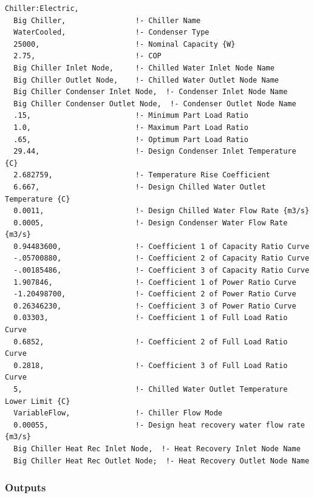 \begin{lstlisting}
Chiller:Electric,
  Big Chiller,                !- Chiller Name
  WaterCooled,                !- Condenser Type
  25000,                      !- Nominal Capacity {W}
  2.75,                       !- COP
  Big Chiller Inlet Node,     !- Chilled Water Inlet Node Name
  Big Chiller Outlet Node,    !- Chilled Water Outlet Node Name
  Big Chiller Condenser Inlet Node,  !- Condenser Inlet Node Name
  Big Chiller Condenser Outlet Node,  !- Condenser Outlet Node Name
  .15,                        !- Minimum Part Load Ratio
  1.0,                        !- Maximum Part Load Ratio
  .65,                        !- Optimum Part Load Ratio
  29.44,                      !- Design Condenser Inlet Temperature {C}
  2.682759,                   !- Temperature Rise Coefficient
  6.667,                      !- Design Chilled Water Outlet Temperature {C}
  0.0011,                     !- Design Chilled Water Flow Rate {m3/s}
  0.0005,                     !- Design Condenser Water Flow Rate {m3/s}
  0.94483600,                 !- Coefficient 1 of Capacity Ratio Curve
  -.05700880,                 !- Coefficient 2 of Capacity Ratio Curve
  -.00185486,                 !- Coefficient 3 of Capacity Ratio Curve
  1.907846,                   !- Coefficient 1 of Power Ratio Curve
  -1.20498700,                !- Coefficient 2 of Power Ratio Curve
  0.26346230,                 !- Coefficient 3 of Power Ratio Curve
  0.03303,                    !- Coefficient 1 of Full Load Ratio Curve
  0.6852,                     !- Coefficient 2 of Full Load Ratio Curve
  0.2818,                     !- Coefficient 3 of Full Load Ratio Curve
  5,                          !- Chilled Water Outlet Temperature Lower Limit {C}
  VariableFlow,               !- Chiller Flow Mode
  0.00055,                    !- Design heat recovery water flow rate {m3/s}
  Big Chiller Heat Rec Inlet Node,  !- Heat Recovery Inlet Node Name
  Big Chiller Heat Rec Outlet Node;  !- Heat Recovery Outlet Node Name
\end{lstlisting}

\subsubsection{Outputs}\label{outputs-3-013}

